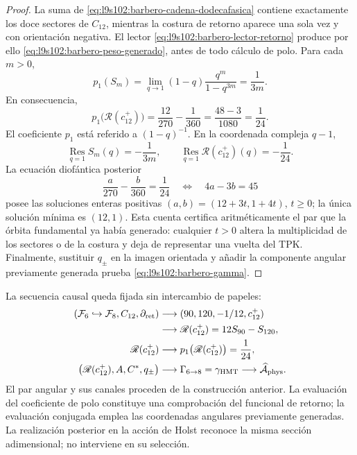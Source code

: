 \begin{proof}
La suma de \eqref{eq:l9s102:barbero-cadena-dodecafasica} contiene exactamente
los doce sectores de \(C_{12}\), mientras la costura de retorno aparece una
sola vez y con orientación negativa. El lector
\eqref{eq:l9s102:barbero-lector-retorno} produce por ello
\eqref{eq:l9s102:barbero-peso-generado}, antes de todo cálculo de polo. Para
cada \(m>0\),
\[
 p_1(S_m)
 =\lim_{q\to1}(1-q)\frac{q^m}{1-q^{3m}}
 =\frac1{3m}.
\]
En consecuencia,
\[
 p_1\bigl(\mathscr R(c_{12}^{+})\bigr)
 =\frac{12}{270}-\frac1{360}
 =\frac{48-3}{1080}=\frac1{24}.
\]
El coeficiente \(p_1\) está referido a \((1-q)^{-1}\).
En la coordenada compleja \(q-1\),
\[
 \operatorname*{Res}_{q=1}S_m(q)=-\frac1{3m},
 \qquad
 \operatorname*{Res}_{q=1}\mathscr R(c_{12}^{+})(q)=-\frac1{24}.
\]
La ecuación diofántica posterior
\[
 \frac a{270}-\frac b{360}=\frac1{24}
 \quad\Longleftrightarrow\quad 4a-3b=45
\]
posee las soluciones enteras positivas
\((a,b)=(12+3t,1+4t)\), \(t\ge0\); la única solución mínima es
\((12,1)\). Esta cuenta certifica aritméticamente el par que la órbita
fundamental ya había generado: cualquier \(t>0\) altera la multiplicidad de
los sectores o de la costura y deja de representar una vuelta del TPK.
Finalmente, sustituir \(q_\pm\) en la imagen orientada y añadir la componente
angular previamente generada prueba \eqref{eq:l9s102:barbero-gamma}.
\end{proof}

La secuencia causal queda fijada sin intercambio de papeles:
\begin{equation}
\begin{aligned}
 (\mathcal F_6\hookrightarrow\mathcal F_8,C_{12},\partial_{\rm ret})
 &\longrightarrow (90,120,-1/12,c_{12}^{+})\\
 &\longrightarrow \mathscr R(c_{12}^{+})=12S_{90}-S_{120},\\
 \mathscr R(c_{12}^{+})
 &\longrightarrow p_1\bigl(\mathscr R(c_{12}^{+})\bigr)=\frac1{24},\\
 \bigl(\mathscr R(c_{12}^{+}),A,C^*,q_\pm\bigr)
 &\longrightarrow \Gamma_{6\to8}=\gamma_{\rm HMT}
 \longrightarrow \widehat{\mathcal A}_{\rm phys}.
\end{aligned}
 \label{eq:l9s102:barbero-cadena-completa}
\end{equation}
El par angular y sus canales proceden de la construcción anterior.
La evaluación del coeficiente de polo constituye una comprobación
del funcional de retorno; la evaluación conjugada emplea las
coordenadas angulares previamente generadas.
La realización posterior en la acción de Holst reconoce la misma sección
adimensional; no interviene en su selección.

